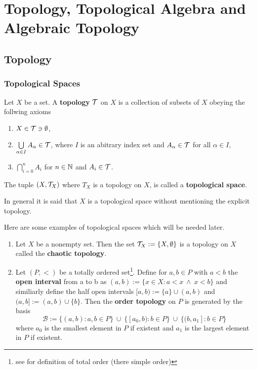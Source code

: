 \section{Topology, Topological Algebra and Algebraic Topology}
\subsection{Topology}

\subsubsection{Topological Spaces}
\begin{defin}
  Let $X$ be a set. A \textbf{topology} $\mathcal{T}$ on $X$ is a collection of subsets of $X$ obeying the follwing axioms
  \begin{enumerate}
    \item $X \in \mathcal{T} \ni \emptyset$,
    \item $\bigcup\limits_{\alpha \in I}A_{\alpha} \in \mathcal{T}$, where $I$ is an abitrary index set and $A_{\alpha} \in \mathcal{T}$ for all $\alpha \in I$,
    \item $\bigcap\limits_{i=0}^n A_i$ for $n \in \mathbb{N}$ and $A_i \in \mathcal{T}$.
  \end{enumerate}
  
  The tuple $(X, \mathcal{T}_X)$ where $T_X$ is a topology on $X$, is called a \textbf{topological space}.
\end{defin}

In general it is said that $X$ is a topological space without mentioning the explicit topology. 

\begin{ex}\label{ex:top}
  Here are some examples of topological spaces which will be needed later.
\begin{enumerate}[label=\textbf{\arabic*.}]
  \item \label{ex:top-chaotic} Let $X$ be a nonempty set. Then the set $\mathcal{T}_X := \{X, \emptyset\}$ is a topology on $X$ called the \textbf{chaotic topology}.
  \item \label{ex:top-order} Let $(P, <)$ be a totally ordered set\footnote{see \cite[p. 24]{MunTop} for definition of total order (there simple order)}. Define for $a, b \in P$ with $a < b$ the \textbf{open interval} from a to b as $(a,b) := \{ x \in X\colon a < x \: \land \: x < b \}$ and similiarly define the half open intervals $[a,b) := \{a\} \cup (a,b)$ and $(a,b] := (a,b) \cup \{ b \}$. 
  Then the \textbf{order topology} on $P$ is generated by the basis
  \begin{equation*}
    \mathcal{B} := \{ (a,b) \colon a, b \in P \} \: \cup \: \{[a_0, b)\colon b \in P\} \: \cup \: \{ (b, a_1]\colon b \in P\}
  \end{equation*}
  where $a_0$ is the smallest element in $P$ if existent and $a_1$ is the largest element in $P$ if existent.
\end{enumerate}
\end{ex}

